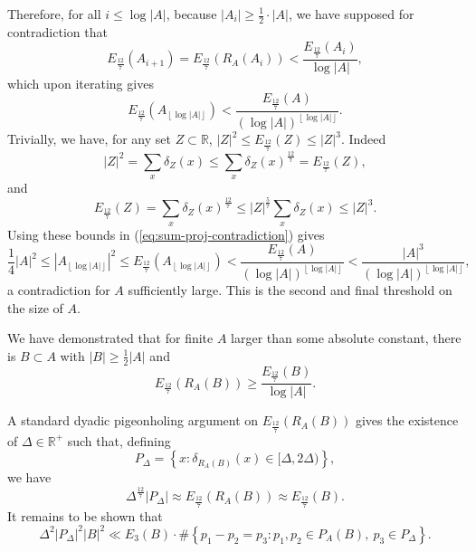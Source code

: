 \documentclass[reqno]{amsart}
\numberwithin{equation}{section}
\begin{document}
Therefore, for all \(i \leq \log \left\lvert A \right\rvert \), because \(\left\lvert A_{i}  \right\rvert \geq \frac{1}{2} \cdot \left\lvert A \right\rvert  \),
we have supposed for contradiction that
\[
    E_{\frac{12}{7} } \left( A_{i+1}  \right) = E_{\frac{12}{7} } \left( R_{A} (A_{i} ) \right) < \frac{E_{\frac{12}{7} } (A_{i} )}{\log \left\lvert A \right\rvert } 
,\]
which upon iterating gives
\begin{equation} \label{eq:sum-proj-contradiction}
    E_{\frac{12}{7} } \left( A_{\left\lfloor \log \left\lvert A \right\rvert  \right\rfloor }  \right) < \frac{E_{\frac{12}{7} } (A)}{\left( \log \left\lvert A \right\rvert \right)  ^{\left\lfloor\log  \left\lvert A \right\rvert  \right\rfloor }}.
\end{equation}  
Trivially, we have, for any set \(Z \subset \mathbb{R} \), \(\left\lvert Z \right\rvert ^{2} \leq E_{\frac{12}{7} } (Z) \leq \left\lvert Z \right\rvert ^{3} \).
Indeed
\[
    \left\lvert Z \right\rvert ^{2} = \sum _{x} \delta_{Z} (x) \leq \sum _{x} \delta_{Z} (x)^{\frac{12}{7} } = E_{\frac{12}{7} } \left( Z \right)
,\]
and
\[
    E_{\frac{12}{7} } (Z) = \sum _{x} \delta_{Z} (x)^{\frac{12}{7} } \leq \left\lvert Z \right\rvert ^{\frac{5}{7} } \sum _{x} \delta_{Z} (x) \leq   \left\lvert Z \right\rvert ^{3}
.\]
Using these bounds in (\ref{eq:sum-proj-contradiction}) gives
\[
    \frac{1}{4} \left\lvert A \right\rvert ^{2} \leq \left\lvert A_{\left\lfloor \log \left\lvert A \right\rvert  \right\rfloor }  \right\rvert ^{2} \leq E_{\frac{12}{7} } \left( A_{\left\lfloor \log \left\lvert A \right\rvert  \right\rfloor }  \right) <\frac{ E_{\frac{12}{7} }(A)}{\left( \log \left\lvert A \right\rvert \right)  ^{\left\lfloor \log \left\lvert A \right\rvert  \right\rfloor }}   < \frac{\left\lvert A \right\rvert ^{3} }{\left( \log \left\lvert A \right\rvert \right)  ^{\left\lfloor \log \left\lvert A \right\rvert  \right\rfloor }} 
,\]
a contradiction for \(A\) sufficiently large. This is the second and final threshold on the size of \(A\).

We have demonstrated that for finite \(A\) larger than some absolute constant, there is \(B \subset A\) with \(\left\lvert B \right\rvert \geq \frac{1}{2} \left\lvert A \right\rvert \) and
\[
    E_{\frac{12}{7} } (R_{A} (B)) \geq \frac{E_{\frac{12}{7} } (B)}{\log \left\lvert A \right\rvert } 
.\]

A standard dyadic pigeonholing argument on \(E_{\frac{12}{7} } (R_{A} (B))\) gives the existence of \(\Delta \in \mathbb{R} ^{+}\) such that,
defining
\[
    P_{\Delta} = \left\{ x : \delta_{R_{A} (B)}(x) \in [\Delta,2\Delta) \right\} 
,\]
we have
\[
    \Delta^{\frac{12}{7} } \left\lvert P_{\Delta}  \right\rvert \approx E_{\frac{12}{7} } (R_{A} (B)) \approx E_{\frac{12}{7} } (B)
.\]
It remains to be shown that
\[
    \Delta^{2} \left\lvert P_{\Delta}  \right\rvert ^{2}\left\lvert B \right\rvert ^{2} \ll E_{3} (B) \cdot \# \left\{ p_1 - p_2 = p_3 : p_1,p_2 \in P_{A} (B),~ p_3 \in P_{\Delta}  \right\} 
.\]
\end{document}
